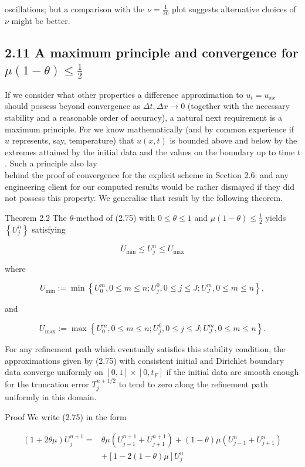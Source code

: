 \documentclass[10pt]{article}
\begin{document}
oscillations; but a comparison with the \(\nu=\frac{1}{20}\) plot suggests alternative choices of \(\nu\) might be better.

\subsection*{2.11 A maximum principle and convergence for \(\mu(1-\theta) \leq \frac{1}{2}\)}
If we consider what other properties a difference approximation to \(u_{t}= u_{x x}\) should possess beyond convergence as \(\Delta t, \Delta x \rightarrow 0\) (together with the necessary stability and a reasonable order of accuracy), a natural next requirement is a maximum principle. For we know mathematically (and by common experience if \(u\) represents, say, temperature) that \(u(x, t)\) is bounded above and below by the extremes attained by the initial data and the values on the boundary up to time \(t\). Such a principle also lay\\
behind the proof of convergence for the explicit scheme in Section 2.6: and any engineering client for our computed results would be rather dismayed if they did not possess this property. We generalise that result by the following theorem.

Theorem 2.2 The \(\theta\)-method of (2.75) with \(0 \leq \theta \leq 1\) and \(\mu(1-\theta) \leq \frac{1}{2}\) yields \(\left\{U_{j}^{n}\right\}\) satisfying

\[
U_{\min } \leq U_{j}^{n} \leq U_{\max }
\]

where

\[
U_{\min }:=\min \left\{U_{0}^{m}, 0 \leq m \leq n ; U_{j}^{0}, 0 \leq j \leq J ; U_{J}^{m}, 0 \leq m \leq n\right\},
\]

and

\[
U_{\max }:=\max \left\{U_{0}^{m}, 0 \leq m \leq n ; U_{j}^{0}, 0 \leq j \leq J ; U_{J}^{m}, 0 \leq m \leq n\right\} .
\]

For any refinement path which eventually satisfies this stability condition, the approximations given by (2.75) with consistent initial and Dirichlet boundary data converge uniformly on \([0,1] \times\left[0, t_{F}\right]\) if the initial data are smooth enough for the truncation error \(T_{j}^{n+1 / 2}\) to tend to zero along the refinement path uniformly in this domain.

Proof We write (2.75) in the form

\[
\begin{aligned}
(1+2 \theta \mu) U_{j}^{n+1}= & \theta \mu\left(U_{j-1}^{n+1}+U_{j+1}^{n+1}\right)+(1-\theta) \mu\left(U_{j-1}^{n}+U_{j+1}^{n}\right) \\
& +[1-2(1-\theta) \mu] U_{j}^{n}
\end{aligned}
\]
\end{document}
